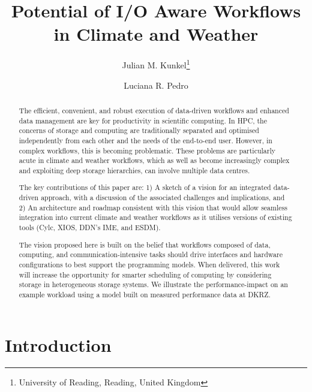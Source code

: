 \documentclass{superfri}
\begin{document}
\author{Julian M. Kunkel\footnote{\label{uread}University of Reading, Reading, United Kingdom} \and Luciana R. Pedro
}

\title{Potential of I/O Aware Workflows in Climate and Weather}

\maketitle{}

\begin{abstract}
The efficient, convenient, and robust execution of data-driven workflows and enhanced data management are key for productivity in scientific computing.
In HPC, the concerns of storage and computing are traditionally separated and optimised independently from each other and the needs of the end-to-end user. However, in complex workflows, this is becoming problematic. These problems are particularly acute in climate and weather workflows, which as well as become increasingly complex and exploiting deep storage hierarchies, can involve multiple data centres.

The key contributions of this paper are:
1) A sketch of a vision for an integrated data-driven approach, with a discussion of the associated challenges and implications, and 2) An architecture and roadmap consistent with this vision that would allow seamless integration into current climate and weather workflows as it utilises versions of existing tools (Cylc, XIOS, DDN's IME, and ESDM).

The vision proposed here is built on the belief that workflows composed of data, computing, and communication-intensive tasks should drive interfaces and hardware configurations to best support the programming models.
When delivered, this work will increase the opportunity for smarter scheduling of computing by considering storage in heterogeneous storage systems.
We illustrate the performance-impact on an example workload using a model built on measured performance data at DKRZ.

\end{abstract}


\section*{Introduction}
\label{sec:intro}
\end{document}
